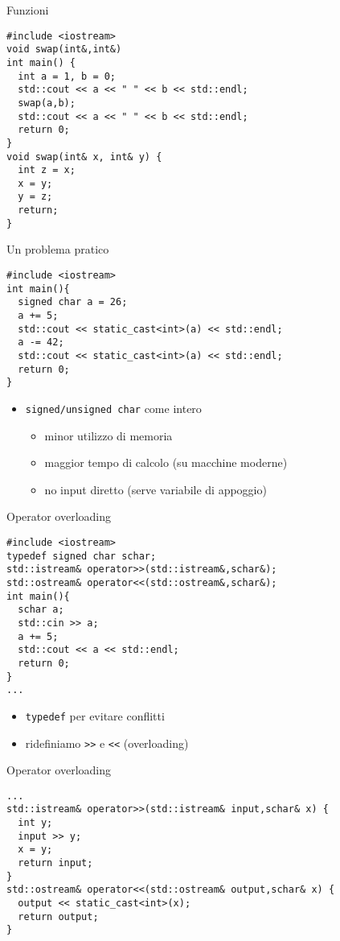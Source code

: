 \begin{frame}[fragile]{Funzioni}
  \vfill
  \begin{lstlisting}
#include <iostream>
void swap(int&,int&)
int main() {
  int a = 1, b = 0;
  std::cout << a << " " << b << std::endl;
  swap(a,b);
  std::cout << a << " " << b << std::endl;
  return 0;
}
void swap(int& x, int& y) {
  int z = x;
  x = y;
  y = z;
  return;
}
  \end{lstlisting}
  \vfill
\end{frame}

\begin{frame}[fragile]{Un problema pratico}
  \vfill
  \begin{lstlisting}
#include <iostream>
int main(){
  signed char a = 26;
  a += 5;
  std::cout << static_cast<int>(a) << std::endl;
  a -= 42;
  std::cout << static_cast<int>(a) << std::endl;
  return 0;
}
  \end{lstlisting}
  \vfill
  \begin{itemize}
    \item \lstinline$signed/unsigned char$ come intero
    \begin{itemize}
      \item minor utilizzo di memoria
      \item maggior tempo di calcolo (su macchine moderne)
      \item no input diretto (serve variabile di appoggio)
    \end{itemize}
  \end{itemize}
  \vfill
\end{frame}

\begin{frame}[fragile]{Operator overloading}
  \vfill
  \begin{lstlisting}
#include <iostream>
typedef signed char schar;
std::istream& operator>>(std::istream&,schar&);
std::ostream& operator<<(std::ostream&,schar&);
int main(){
  schar a;
  std::cin >> a;
  a += 5;
  std::cout << a << std::endl;
  return 0;
}
...\end{lstlisting}
  \vfill
  \begin{itemize}
    \item \lstinline$typedef$ per evitare conflitti
    \vfill
    \item ridefiniamo \lstinline$>>$ e \lstinline$<<$ (\alert{overloading})
  \end{itemize}
  \vfill
\end{frame}

\begin{frame}[fragile]{Operator overloading}
  \vfill
  \begin{lstlisting}[firstnumber=11]
...
std::istream& operator>>(std::istream& input,schar& x) {
  int y;
  input >> y;
  x = y;
  return input;
}
std::ostream& operator<<(std::ostream& output,schar& x) {
  output << static_cast<int>(x);
  return output;
}
  \end{lstlisting}
  \vfill
\end{frame}

